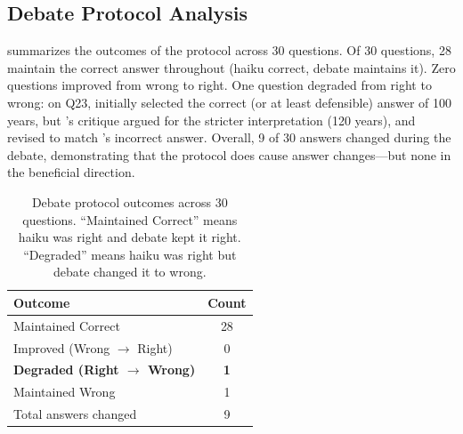 \begin{table}[t]
\centering
\caption{Pairwise Pearson error correlation matrix. Values closer to 0 indicate
more diverse failure modes. $p$-values assess significance against zero correlation.
Diversity index = $1 - r$.}
\label{tab:error_correlation}
\end{table}

\subsection{Debate Protocol Analysis}

 summarizes the outcomes of the
\debate protocol across 30 questions.
Of 30 questions, 28 maintain the correct answer throughout (haiku correct,
debate maintains it). Zero questions improved from wrong to right.
One question degraded from right to wrong: on Q23, \haiku initially selected
the correct (or at least defensible) answer of 100 years, but \sonnet's critique
argued for the stricter interpretation (120 years), and \haiku revised to
match \sonnet's incorrect answer.
Overall, 9 of 30 answers changed during the debate, demonstrating that the
protocol does cause answer changes---but none in the beneficial direction.

\begin{table}[t]
\centering
\caption{Debate protocol outcomes across 30 questions.
``Maintained Correct'' means haiku was right and debate kept it right.
``Degraded'' means haiku was right but debate changed it to wrong.}
\label{tab:debate_outcomes}
\begin{tabular}{@{}lc@{}}
\toprule
Outcome & Count \\
\midrule
Maintained Correct      & 28 \\
Improved (Wrong $\to$ Right) & 0 \\
\textbf{Degraded (Right $\to$ Wrong)} & \textbf{1} \\
Maintained Wrong        & 1 \\
\midrule
Total answers changed   & 9 \\
\bottomrule
\end{tabular}
\end{table}

